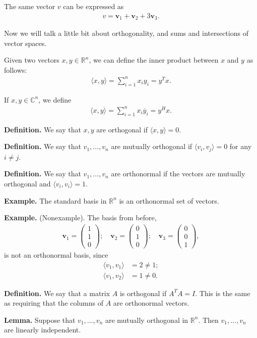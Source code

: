 \documentclass{article}
\newcommand{\mat}[1]{\begin{pmatrix}#1\end{pmatrix}}
\newcommand{\la}{\langle}
\newcommand{\ra}{\rangle}
\newcommand{\ol}{\overline}
\newcommand{\mbf}{\mathbf}
\begin{document}
The same vector $v$ can be expressed as
\begin{align*}
  v = \mbf{v}_1 + \mbf{v}_2 + 3 \mbf{v}_3.
\end{align*}

Now we will talk a little bit about orthogonality, and sums and intersections of vector spaces.

Given two vectors $x, y \in \mathbb{R}^n$, we can define the inner product between $x$ and $y$ as follows:
\begin{align*}
  \la x, y \ra = \sum_{i=1}^{n} x_i y_i = y^T x.
\end{align*}

If $x, y \in \mathbb{C}^n$, we define
\begin{align*}
  \la x, y \ra = \sum_{i=1}^{n} x_i \ol{y}_i = y^H x.
\end{align*}

{\bf Definition.} We say that $x, y$ are orthogonal if $\la x, y \ra = 0$.

{\bf Definition.} We say that $v_1, \dots, v_n$ are mutually orthogonal if $\la v_i, v_j \ra = 0$ for any $i \neq j$.

{\bf Definition.} We say that $v_1, \dots, v_n$ are orthonormal if the vectors are mutually orthogonal and $\la v_i, v_i \ra = 1$.

{\bf Example.} The standard basis in $\mathbb{R}^n$ is an orthonormal set of vectors.

{\bf Example.} (Nonexample).  The basis from before,
\begin{align*}
  \mbf{v}_1 = \mat{1 \\ 1 \\ 0}; \quad \mbf{v}_2 = \mat{0 \\ 1 \\ 0}; \quad \mbf{v}_3 = \mat{0 \\ 0 \\ 1},
\end{align*}
is not an orthonormal basis, since
\begin{align*}
  \la v_1, v_1 \ra &= 2 \neq 1; \\
  \la v_1, v_2 \ra &= 1 \neq 0.
\end{align*}

{\bf Definition.} We say that a matrix $A$ is orthogonal if $A^T A = I$.  This is the same as requiring that the columns of $A$ are orthonormal vectors.

{\bf Lemma.} Suppose that $v_1, \dots, v_n$ are mutually orthogonal in $\mathbb{R}^n$.  Then $v_1, \dots, v_n$ are linearly independent.
\end{document}
